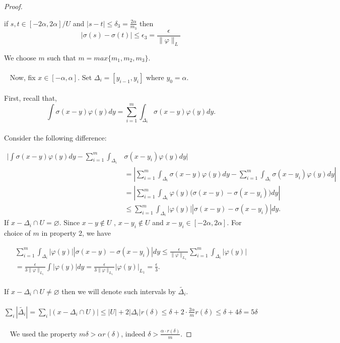 \documentclass[../main.tex]{subfiles}
\begin{document}
\begin{proof}
\begin{enumerate}
			 if $s,t \in [-2\alpha, 2\alpha]/U$ and $|s-t|\leq \delta_3 = \frac{2\alpha}{m_3}$ then $$|\sigma(s)-\sigma(t)| \leq \epsilon_3= \frac{\epsilon}{\|\varphi\|_L}$$
		\end{enumerate}
		We choose $m$ such that $m=max\{m_1,m_2,m_3\}$. \\ \\ 
		Now, fix $x\in [-\alpha,\alpha] $. Set $\Delta_i= [y_{i-1},y_i]$ where $y_0= \alpha$. \\ \\
		First, recall that,\\
		$$\int \sigma(x-y)\varphi(y)dy = \sum_{i=1}^m \int_{\Delta_i}\sigma(x-y)\varphi(y)dy.$$
		\\ Consider the following difference:

\begin{equation*} 
	\begin{split}
		\Bigg| \int \sigma(x-y)\varphi(y)dy -  \sum_{i=1}^m \int_{\Delta_i}& \sigma(x-y_i) \varphi(y)dy \Bigg|  \\
		& = \left|  \sum_{i=1}^m \int_{\Delta_i}\sigma(x-y)\varphi(y)dy -  \sum_{i=1}^m \int_{\Delta_i}\sigma(x-y_i)\varphi(y)dy \right|  \\
		& =  \left|  \sum_{i=1}^m \int_{\Delta_i}\varphi(y)\Big( \sigma(x-y) - \sigma(x-y_i)\Big)dy \right| \\
		&\leq  \sum_{i=1}^m \int_{\Delta_i} \left| \varphi(y)\right| \left| \sigma(x-y)-\sigma(x-y_i)\right|dy.
	\end{split}
\end{equation*}
		If $x-\Delta_i \cap U = \varnothing $. Since $x-y \notin U$ , $x-y_i \notin U$ and $x-y_i \in [-2\alpha,2\alpha]$. For choice of $m$ in property 2, we have
		
		\begin{multline*}
			\sum_{i=1}^m  \int_{\Delta_i} \left| \varphi(y)\right| \left| \sigma(x-y)-\sigma(x-y_i)\right|dy  \leq  \frac{\epsilon}{\| \varphi\|_{L_1}}  \sum_{i=1}^m  \int_{\Delta_i} \left| \varphi(y)\right| \\ =  \frac{\epsilon}{3\| \varphi\|_{L_1}} \int \left|\varphi(y)\right| dy =  \frac{\epsilon}{3\| \varphi\|_{L_1}} \left|\varphi(y)\right|_{L_1}  = \frac{\epsilon}{3} . 
		\end{multline*}
	\\ 
		\noindent If $x-\Delta_i \cap U \neq \varnothing$ then we will denote such intervals by $\tilde{\Delta_i}.$\\ \\ 
		$\sum_i |\tilde{\Delta_i}| = \sum_i|(x-\Delta_i \cap U)| \leq |U|+2|\Delta_i| r(\delta) \leq \delta + 2 \cdot \frac{2\alpha}{m} r(\delta) \leq \delta +4\delta = 5\delta$  \\ \\ 
		We used the property $m\delta > \alpha r(\delta) $,  indeed $ \delta > \frac{\alpha \cdot r(\delta)}{m}$. 
		

\end{proof}
\end{document}
